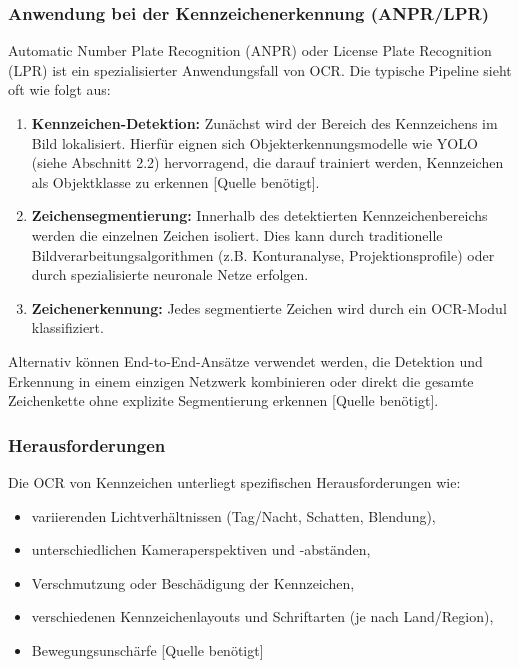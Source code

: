 \subsubsection{Anwendung bei der Kennzeichenerkennung (ANPR/LPR)}
Automatic Number Plate Recognition (ANPR) oder License Plate Recognition (LPR) ist ein spezialisierter Anwendungsfall von OCR. Die typische Pipeline sieht oft wie folgt aus:

\begin{enumerate}
    \item \textbf{Kennzeichen-Detektion:} Zunächst wird der Bereich des Kennzeichens im Bild lokalisiert. Hierfür eignen sich Objekterkennungsmodelle wie YOLO (siehe Abschnitt 2.2) hervorragend, die darauf trainiert werden, Kennzeichen als Objektklasse zu erkennen [Quelle benötigt].

    \item \textbf{Zeichensegmentierung:} Innerhalb des detektierten Kennzeichenbereichs werden die einzelnen Zeichen isoliert. Dies kann durch traditionelle Bildverarbeitungsalgorithmen (z.B. Konturanalyse, Projektionsprofile) oder durch spezialisierte neuronale Netze erfolgen.

    \item \textbf{Zeichenerkennung:} Jedes segmentierte Zeichen wird durch ein OCR-Modul klassifiziert.
\end{enumerate}

Alternativ können End-to-End-Ansätze verwendet werden, die Detektion und Erkennung in einem einzigen Netzwerk kombinieren oder direkt die gesamte Zeichenkette ohne explizite Segmentierung erkennen [Quelle benötigt].

\subsubsection{Herausforderungen}
Die OCR von Kennzeichen unterliegt spezifischen Herausforderungen wie:
\begin{itemize}
    \item variierenden Lichtverhältnissen (Tag/Nacht, Schatten, Blendung),
    \item unterschiedlichen Kameraperspektiven und -abständen,
    \item Verschmutzung oder Beschädigung der Kennzeichen,
    \item verschiedenen Kennzeichenlayouts und Schriftarten (je nach Land/Region),
    \item Bewegungsunschärfe [Quelle benötigt]
\end{itemize}

